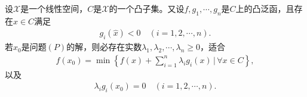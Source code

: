 \documentclass[../../main.tex]{subfiles}%
\begin{document}
\begin{theorem}\label{theorem:Kuhn-Tucker定理}
设$\mathscr{X}$是一个线性空间，$C$是$\mathscr{X}$的一个凸子集。又设$f, g_1, \cdots, g_n$是$C$上的凸泛函，且存在$\widehat{x} \in C$满足
\begin{align*}
g_i(\widehat{x}) < 0 \quad (i=1,2,\cdots,n).
\end{align*}
若$x_0$是问题$(P)$的解，则必存在实数$\lambda_1, \lambda_2, \cdots, \lambda_n \geqslant 0$，适合
\begin{align*}
f(x_0) = \min \left\{ f(x) + \sum\limits_{i=1}^n \lambda_i g_i(x) \,\bigg|\, \forall x \in C \right\},
\end{align*}
以及
\begin{align*}
\lambda_i g_i(x_0) = 0 \quad (i=1,2,\cdots,n).
\end{align*}
\end{theorem}
\end{document}

